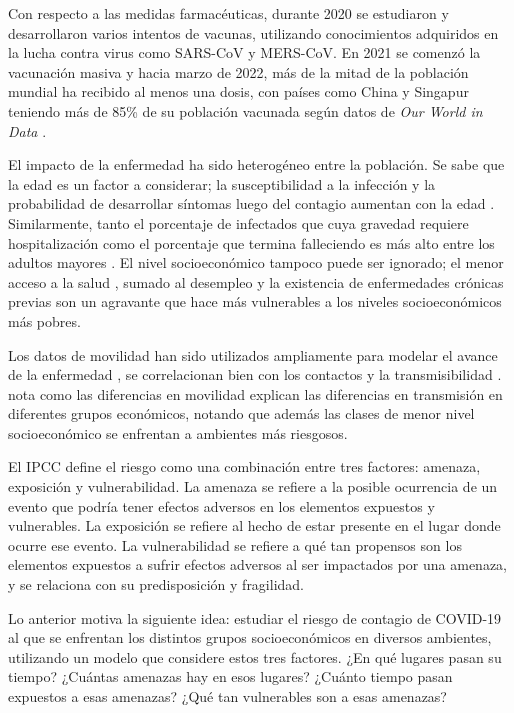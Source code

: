\begin{intro}
Con respecto a las medidas farmacéuticas, durante 2020 se estudiaron y desarrollaron varios intentos de vacunas, utilizando conocimientos adquiridos en la lucha contra virus como SARS-CoV y MERS-CoV. En 2021 se comenzó la vacunación masiva y hacia marzo de 2022, más de la mitad de la población mundial ha recibido al menos una dosis, con países como China y Singapur teniendo más de 85\% de su población vacunada según datos de \textit{Our World in Data} \cite{}.

El impacto de la enfermedad ha sido heterogéneo entre la población. Se sabe que la edad es un factor a considerar; la susceptibilidad a la infección y la probabilidad de desarrollar síntomas luego del contagio aumentan con la edad \cite{Davies2020}. Similarmente, tanto el porcentaje de infectados que cuya gravedad requiere hospitalización como el porcentaje que termina falleciendo es más alto entre los adultos mayores \cite{Verity2020}. El nivel socioeconómico tampoco puede ser ignorado; el menor acceso a la salud \cite{Wang2020}, sumado al desempleo y la existencia de enfermedades crónicas previas \cite{Ahmed2020} son un agravante que hace más vulnerables a los niveles socioeconómicos más pobres.

Los datos de movilidad han sido utilizados ampliamente para modelar el avance de la enfermedad \cite{Lai2020}\cite{Oliver2020}, se correlacionan bien con los contactos \cite{Prem2020} y la transmisibilidad \cite{Nasan2021}. \cite{Chang2021} nota como las diferencias en movilidad explican las diferencias en transmisión en diferentes grupos económicos, notando que además las clases de menor nivel socioeconómico se enfrentan a ambientes más riesgosos.

El IPCC define \cite{Field2012} el riesgo como una combinación entre tres factores: amenaza, exposición y vulnerabilidad. La amenaza se refiere a la posible ocurrencia de un evento que podría tener efectos adversos en los elementos expuestos y vulnerables. La exposición se refiere al hecho de estar presente en el lugar donde ocurre ese evento. La vulnerabilidad se refiere a qué tan propensos son los elementos expuestos a sufrir efectos adversos al ser impactados por una amenaza, y se relaciona con su predisposición y fragilidad.

Lo anterior motiva la siguiente idea: estudiar el riesgo de contagio de COVID-19 al que se enfrentan los distintos grupos socioeconómicos en diversos ambientes, utilizando un modelo que considere estos tres factores. ¿En qué lugares pasan su tiempo? ¿Cuántas amenazas hay en esos lugares? ¿Cuánto tiempo pasan expuestos a esas amenazas? ¿Qué tan vulnerables son a esas amenazas? 


\end{intro}
